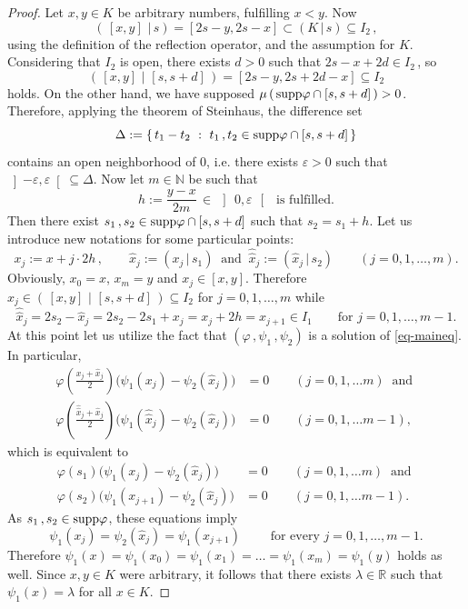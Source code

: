 \documentclass[10pt,a4paper]{amsart}
\newcommand{\NN}{\mathbb{N}}
\newcommand{\RR}{\mathbb{R}}
\newcommand{\rfl}[2]{\left( #1 \, \vert \, #2 \right)}
\newcommand{\supp}{\mbox{\rm supp}}
\begin{document}
\begin{proof}
Let 
$ x,y \in K $ be arbitrary numbers, 
fulfilling $ x < y $. 
Now 
\[ 
\rfl{ \, [x,y] \, }{s} = 
\left[ 2s-y, 2s-x \right] 
\subset \rfl{K}{s} \subseteq I_2 \,, 
\]
using the definition of the reflection operator, 
and the assumption for $ K $. 
Considering that $ I_2 $ is open, 
there exists $ d > 0 $ such that 
$ 2s - x + 2d \in I_2 \,$, so 
\[
\rfl{ \, [x,y] \, }{ \, [s, s+d] \, } = 
\left[ 2s-y , 2s + 2d -x \right] \subseteq I_2 
\]
holds. 
On the other hand, we have supposed 
$ \mu \left( \, \supp \varphi \cap 
\left[ s, s + d \right] \, \right) > 0 $. 
Therefore, applying the 
theorem of Steinhaus, the difference set 
\[
\Delta := \lbrace \, t_1 - t_2 \ : \ 
t_1 \,, t_2 \in \supp \varphi \cap [s,s+d] \, \rbrace
\] 
contains an open neighborhood of $ 0 $, 
i.e. there exists 
$ \varepsilon > 0 $ such that 
$ \left] - \varepsilon , \varepsilon 
\right[ \subseteq \Delta $. 
Now let $ m \in \NN $ be such that 
\[
h := \frac{y-x}{2m} \, \in \, 
\left] \, 0, \varepsilon \, \right[ 
\, \mbox{ is fulfilled}.
\]
Then there exist 
$ s_1 \,, s_2 \in \supp \varphi \cap [s, s+d] $ 
such that 
$ s_2 = s_1 + h $. 
Let us introduce new notations 
for some particular points: 
\[
x_j := x + j \cdot 2h \,, \qquad 
\widehat{x}_j := \rfl{x_j}{s_1} \ \mbox{ and } \ 
\widehat{\widehat{x}}_j := \rfl{\widehat{x}_j}{s_2} 
\qquad (j = 0,1, \dots , m).
\]
Obviously, 
$ x_0 = x $, $ x_m = y $ and $ x_j \in [x,y] $. 
Therefore 
$ \widehat{x}_j \in 
\rfl{\, [x,y] \,}{\, [s,s+d] \,} \subseteq I_2 $ 
for $ j=0,1, \dots ,m $ while 
\[
\widehat{\widehat{x}}_j = 2s_2 - \widehat{x}_j = 
2s_2 - 2s_1 + x_j = x_j + 2h = x_{j+1} \in I_1 
\qquad \mbox{for } j = 0,1, \dots , m-1. 
\] 
At this point let us utilize the fact that 
$ \left( \varphi \,, \psi_1 \,, \psi_2 \right) $ 
is a solution of \eqref{eq-maineq}. 
In particular, 
\begin{align*}
\varphi \left( 
\frac{x_j + \widehat{x}_j}{2} \right) 
\bigl( 
\psi_1 (x_j) - \psi_2(\widehat{x}_j) 
\bigr) &= 0 
\qquad (j = 0,1, \dots m) \ \mbox{ and } \\ 
\varphi \left( 
\frac{\widehat{\widehat{x}}_j + \widehat{x}_j}{2} \right) 
\bigl( 
\psi_1 (\widehat{\widehat{x}}_j) - \psi_2(\widehat{x}_j) 
\bigr) &= 0 
\qquad (j = 0,1, \dots m-1), 
\end{align*} 
which is equivalent to 
\begin{align*} 
\varphi \left( s_1 \right) 
\bigl( 
\psi_1 (x_j) - \psi_2(\widehat{x}_j) 
\bigr) &= 0 
\qquad (j = 0,1, \dots m) \ \mbox{ and } \\ 
\varphi \left( s_2 \right) 
\bigl( 
\psi_1 (x_{j+1}) - \psi_2(\widehat{x}_j) 
\bigr) &= 0 
\qquad (j = 0,1, \dots m-1).  
\end{align*} 
As $ s_1 \,, s_2 \in \supp \varphi $, 
these equations imply 
\[ 
\psi_1(x_j) = \psi_2( \widehat{x}_j ) = \psi_1(x_{j+1}) 
\qquad \mbox{ for every } 
j = 0,1, \dots ,m-1.
\]
Therefore 
$ \psi_1(x) = \psi_1 (x_0) = \psi_1 (x_1) = \dots = 
\psi_1 (x_m) = \psi_1(y) $ 
holds as well. 
Since $ x,y \in K $ were arbitrary, it follows 
that there exists 
$ \lambda \in \RR $ such that 
$ \psi_1(x) = \lambda$  for all $ x \in K $. 


\end{proof}
\end{document}
